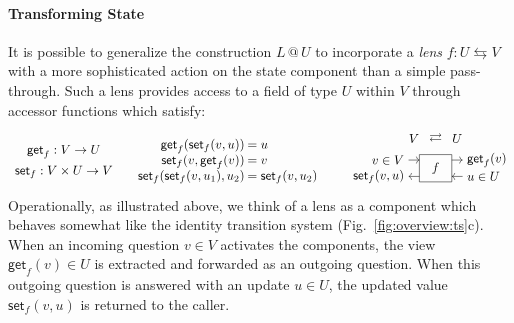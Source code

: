 \documentclass[acmsmall,screen,review,anonymous]{acmart}
\newcommand{\kw}[1]{\ensuremath{ \mathsf{#1} }}
\newcommand{\lensarrow}{\leftrightarrows}
\begin{document}
\paragraph{Transforming State} %


It is possible to generalize the construction $L \mathbin@ U$
to incorporate a \emph{lens} $f : U \lensarrow V$
with a more sophisticated action on the state component
than a simple pass-through.
Such a lens provides access to a field of type $U$ within $V$
through accessor functions which satisfy:
\[
  \begin{array}{c}
    \kw{get}_f : V \rightarrow U \\[1ex]
    \kw{set}_f : V \times U \rightarrow V
  \end{array}
  \quad
  \begin{array}{r@{\:}l}
    \kw{get}_f(\kw{set}_f(v, u)) &= u \\
    \kw{set}_f(v, \kw{get}_f(v)) &= v \\
    \kw{set}_f(\kw{set}_f(v, u_1), u_2) &= \kw{set}_f(v, u_2)
  \end{array}
  \qquad
  \begin{tikzpicture}[yscale=0.15,xscale=0.30,baseline=(V.base)]
    \draw (5,-1) rectangle (8,4) node[midway] {$f$};
    \draw[->] (4,3) node[left] (V) {$v \in V$} -- (5,3) node[above=1em,midway] (A2) {$V$};
      \draw[->] (8,3) -- (9,3) node[above=1em,midway] (A1) {$U$} node[right] {$\kw{get}_f(v)$};
      \draw[->] (9,0) node[right] {$u \in U$} -- (8,0);
    \draw[->] (5,0) -- (4,0) node[left] {$\kw{set}_f(v, u)$};
    \path (A1) -- node {$\rightleftarrows$} (A2);
  \end{tikzpicture}
\]
Operationally,
as illustrated above,
we think of a lens as a component
which behaves somewhat like
the identity transition system
(Fig.~\ref{fig:overview:ts}c).
When an incoming question $v \in V$ activates the components,
the view $\kw{get}_f(v) \in U$ is extracted and
forwarded as an outgoing question.
When this outgoing question is answered with an update $u \in U$,
the updated value $\kw{set}_f(v, u)$ is returned to the caller.
\end{document}
